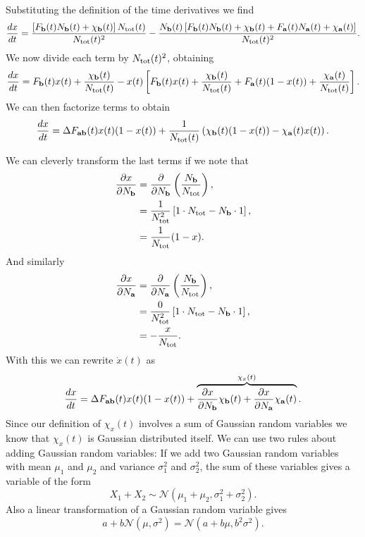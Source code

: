 Substituting the definition of the time derivatives we find
\begin{equation}
  {d{x} \over dt} = {\left[ F_{\mathbf{b}}(t) N_{\mathbf{b}}(t) + \chi_{\mathbf{b}}(t)  \right] N_{\text{tot}}(t)
  \over N_{\text{tot}}(t)^2} -
  {N_{\mathbf{b}}(t)
  \left[ F_{\mathbf{b}}(t) N_{\mathbf{b}}(t) + \chi_{\mathbf{b}}(t) +
         F_{\mathbf{a}}(t) N_{\mathbf{a}}(t) + \chi_{\mathbf{a}}(t)\right] \over N_{\text{tot}}(t)^2}.
\end{equation}
We now divide each term by $N_{\text{tot}}(t)^2$, obtaining
\begin{equation}
  {d{x} \over dt} = F_{\mathbf{b}}(t)x(t) + {\chi_{\mathbf{b}}(t) \over N_{\text{tot}}(t)} -
  x(t) \left[ F_{\mathbf{b}}(t)x(t) + {\chi_{\mathbf{b}}(t) \over N_{\text{tot}}(t)} +
              F_{\mathbf{a}}(t)(1 - x(t)) + {\chi_{\mathbf{a}}(t) \over N_{\text{tot}}(t)} \right].
\end{equation}
We can then factorize terms to obtain
\begin{equation}
  {d{x} \over dt} = \Delta F_{\mathbf{ab}}(t) x(t) (1 - x(t)) + {1 \over N_{\text{tot}}(t)}
  \left( \chi_{\mathbf{b}}(t)(1 - x(t)) - \chi_{\mathbf{a}}(t) x(t) \right).
\end{equation}

We can cleverly transform the last terms if we note that
\begin{align}
  {\partial x \over \partial N_{\mathbf{b}}} &= {\partial \over \partial N_{\mathbf{b}}}
  \left( {N_{\mathbf{b}} \over N_{\text{tot}}} \right), \\
  &= {1 \over N_{\text{tot}}^2} \left[ 1 \cdot N_{\text{tot}} - N_{\mathbf{b}} \cdot 1 \right],\\
  &= {1 \over N_{\text{tot}}}(1 - x).
\end{align}
And similarly
\begin{align}
  {\partial x \over \partial N_{\mathbf{a}}} &= {\partial \over \partial N_{\mathbf{a}}}
  \left( {N_{\mathbf{b}} \over N_{\text{tot}}} \right), \\
  &= {0 \over N_{\text{tot}}^2} \left[ 1 \cdot N_{\text{tot}} - N_{\mathbf{b}} \cdot 1 \right],\\
  &= - {x \over N_{\text{tot}}}.
\end{align}
With this we can rewrite $\dot{x}(t)$ as
\begin{equation}
  {d{x} \over dt} = \Delta F_{\mathbf{ab}}(t) x(t) (1 - x(t)) + \overbrace{
  {\partial x \over \partial N_{\mathbf{b}}} \chi_{\mathbf{b}}(t) +
  {\partial x \over \partial N_{\mathbf{a}}} \chi_{\mathbf{a}}(t)
  }^{\chi_x(t)}.
\end{equation}
Since our definition of $\chi_x(t)$ involves a sum of Gaussian random variables
we know that $\chi_x(t)$ is Gaussian distributed itself. We can use two rules
about adding Gaussian random variables: If we add two Gaussian random variables
with mean $\mu_1$ and $\mu_2$ and variance $\sigma_1^2$ and $\sigma_2^2$, the
sum of these variables gives a variable of the form
\begin{equation}
  X_1 + X_2 \sim \mathcal{N}\left( \mu_1 + \mu_2,
                                   \sigma_1^2 + \sigma_2^2 \right).
\end{equation}
Also a linear transformation of a Gaussian random variable gives
\begin{equation}
  a + b \mathcal{N} \left( \mu, \sigma^2 \right) =
  \mathcal{N}(a + b \mu, b^2 \sigma^2).
\end{equation}

